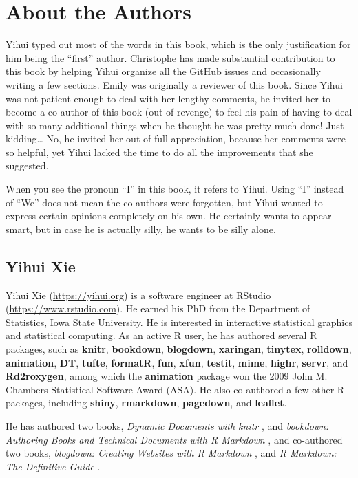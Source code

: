 \documentclass[
  11pt,
]{krantz}
\begin{document}
\hypertarget{author}{%
\chapter*{About the Authors}\label{author}}


Yihui typed out most of the words in this book, which is the only justification for him being the ``first'' author. Christophe has made substantial contribution to this book by helping Yihui organize all the GitHub issues and occasionally writing a few sections. Emily was originally a reviewer of this book. Since Yihui was not patient enough to deal with her lengthy comments, he invited her to become a co-author of this book (out of revenge) to feel his pain of having to deal with so many additional things when he thought he was pretty much done! Just kidding\ldots{} No, he invited her out of full appreciation, because her comments were so helpful, yet Yihui lacked the time to do all the improvements that she suggested.

When you see the pronoun ``I'' in this book, it refers to Yihui. Using ``I'' instead of ``We'' does not mean the co-authors were forgotten, but Yihui wanted to express certain opinions completely on his own. He certainly wants to appear smart, but in case he is actually silly, he wants to be silly alone.

\hypertarget{yihui-xie}{%
\section*{Yihui Xie}\label{yihui-xie}}


Yihui Xie (\url{https://yihui.org}) is a software engineer at RStudio (\url{https://www.rstudio.com}). He earned his PhD from the Department of Statistics, Iowa State University. He is interested in interactive statistical graphics and statistical computing. As an active R user, he has authored several R packages, such as \textbf{knitr}, \textbf{bookdown}, \textbf{blogdown}, \textbf{xaringan}, \textbf{tinytex}, \textbf{rolldown}, \textbf{animation}, \textbf{DT}, \textbf{tufte}, \textbf{formatR}, \textbf{fun}, \textbf{xfun}, \textbf{testit}, \textbf{mime}, \textbf{highr}, \textbf{servr}, and \textbf{Rd2roxygen}, among which the \textbf{animation} package won the 2009 John M. Chambers Statistical Software Award (ASA). He also co-authored a few other R packages, including \textbf{shiny}, \textbf{rmarkdown}, \textbf{pagedown}, and \textbf{leaflet}.

He has authored two books, \emph{Dynamic Documents with knitr} \citep{knitr2015}, and \emph{bookdown: Authoring Books and Technical Documents with R Markdown} \citep{bookdown2016}, and co-authored two books, \emph{blogdown: Creating Websites with R Markdown} \citep{blogdown2017}, and \emph{R Markdown: The Definitive Guide} \citep{rmarkdown2018}.
\end{document}

